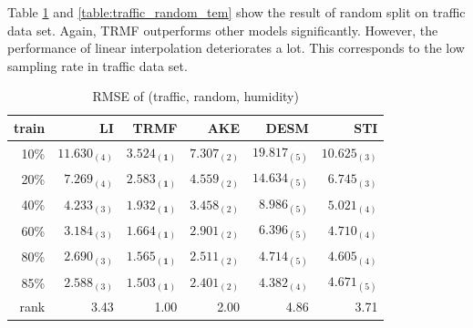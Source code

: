 Table \ref{table:traffic_random_hum} and \ref{table:traffic_random_tem} show the result of random split on traffic data set. Again, TRMF outperforms other models significantly. However, the performance of linear interpolation deteriorates a lot. This corresponds to the low sampling rate in traffic data set. 

\begin{table} [htbp]
\centering
\caption{RMSE of (traffic, random, humidity)}
\label{table:traffic_random_hum}
\begin{tabular}{ r | r r r r r}
	train	&LI	&TRMF	&AKE	&DESM	&STI\\ \hline
	10\% & $ 11.630_{(4)} $ & $ \mathbf{ 3.524_{(1)} } $ & $ 7.307_{(2)} $ & $ 19.817_{(5)} $ & $ 10.625_{(3)} $ \\
	20\% & $ 7.269_{(4)} $ & $ \mathbf{ 2.583_{(1)} } $ & $ 4.559_{(2)} $ & $ 14.634_{(5)} $ & $ 6.745_{(3)} $ \\
	40\% & $ 4.233_{(3)} $ & $ \mathbf{ 1.932_{(1)} } $ & $ 3.458_{(2)} $ & $ 8.986_{(5)} $ & $ 5.021_{(4)} $ \\
	60\% & $ 3.184_{(3)} $ & $ \mathbf{ 1.664_{(1)} } $ & $ 2.901_{(2)} $ & $ 6.396_{(5)} $ & $ 4.710_{(4)} $ \\
	80\% & $ 2.690_{(3)} $ & $ \mathbf{ 1.565_{(1)} } $ & $ 2.511_{(2)} $ & $ 4.714_{(5)} $ & $ 4.605_{(4)} $ \\
	85\% & $ 2.588_{(3)} $ & $ \mathbf{ 1.503_{(1)} } $ & $ 2.401_{(2)} $ & $ 4.382_{(4)} $ & $ 4.671_{(5)} $ \\ \hline
	rank &3.43 &1.00 &2.00 &4.86 &3.71 \\
\end{tabular}
\end{table}

